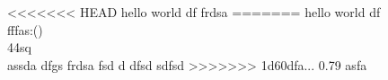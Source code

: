 \documentclass{article}
\begin{document}
<<<<<<< HEAD
	hello world df \textbf{\gitRel}
	\newpage
	frdsa
	\newpage
=======
	hello world df \textbf{\gitRel}\\
	fffas:\gitRoff(\gitCommitterDate)\\
	44sq
	\\
	assda dfgs
	frdsa fsd d dfsd sdfsd
>>>>>>> 1d60dfa... 0.79
	asfa
\end{document}
